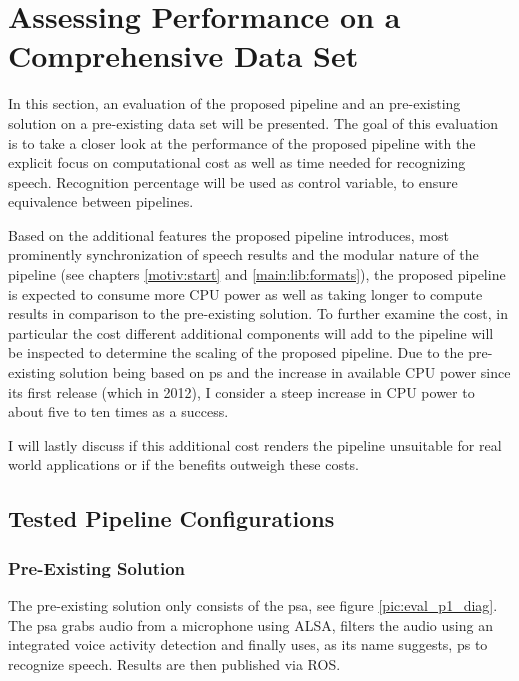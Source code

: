 

\section{Assessing Performance on a Comprehensive Data Set}
\label{eval:dataset}

In this section, an evaluation of the proposed pipeline and an pre-existing solution on a pre-existing data set will be presented.
The goal of this evaluation is to take a closer look at the performance of the proposed pipeline with the explicit focus on computational cost as well as time needed for recognizing speech.
Recognition percentage will be used as control variable, to ensure equivalence between pipelines.

Based on the additional features the proposed pipeline introduces, most prominently synchronization of speech results and the modular nature of the pipeline (see chapters \ref{motiv:start} and \ref{main:lib:formats}), the proposed pipeline is expected to consume more CPU power as well as taking longer to compute results in comparison to the pre-existing solution.
To further examine the cost, in particular the cost different additional components will add to the pipeline will be inspected to determine the scaling of the proposed pipeline.
Due to the pre-existing solution being based on \gls{ps} and the increase in available CPU power since its first release (which in 2012), I consider a steep increase in CPU power to about five to ten times as a success.


I will lastly discuss if this additional cost renders the pipeline unsuitable for real world applications or if the benefits outweigh these costs.


\subsection{Tested Pipeline Configurations} %

\subsubsection{Pre-Existing Solution}

The pre-existing solution only consists of the \gls{psa}, see figure \ref{pic:eval_p1_diag}.
The \gls{psa} grabs audio from a microphone using ALSA, filters the audio using an integrated voice activity detection and finally uses, as its name suggests, \gls{ps} to recognize speech.
Results are then published via ROS.

